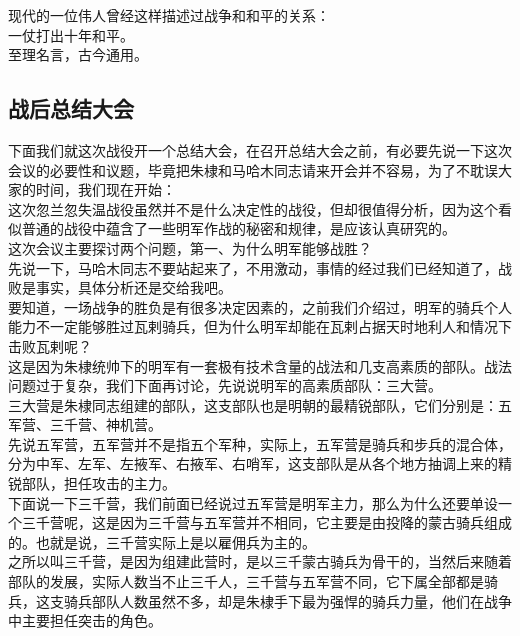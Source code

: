 \begin{multicols}{\theparacolNo}
现代的一位伟人曾经这样描述过战争和和平的关系：\\

一仗打出十年和平。\\

至理名言，古今通用。\\

\subsection{战后总结大会}
下面我们就这次战役开一个总结大会，在召开总结大会之前，有必要先说一下这次会议的必要性和议题，毕竟把朱棣和马哈木同志请来开会并不容易，为了不耽误大家的时间，我们现在开始：\\

这次忽兰忽失温战役虽然并不是什么决定性的战役，但却很值得分析，因为这个看似普通的战役中蕴含了一些明军作战的秘密和规律，是应该认真研究的。\\

这次会议主要探讨两个问题，第一、为什么明军能够战胜？\\

先说一下，马哈木同志不要站起来了，不用激动，事情的经过我们已经知道了，战败是事实，具体分析还是交给我吧。\\

要知道，一场战争的胜负是有很多决定因素的，之前我们介绍过，明军的骑兵个人能力不一定能够胜过瓦剌骑兵，但为什么明军却能在瓦剌占据天时地利人和情况下击败瓦剌呢？\\

这是因为朱棣统帅下的明军有一套极有技术含量的战法和几支高素质的部队。战法问题过于复杂，我们下面再讨论，先说说明军的高素质部队：三大营。\\

三大营是朱棣同志组建的部队，这支部队也是明朝的最精锐部队，它们分别是：五军营、三千营、神机营。\\

先说五军营，五军营并不是指五个军种，实际上，五军营是骑兵和步兵的混合体，分为中军、左军、左掖军、右掖军、右哨军，这支部队是从各个地方抽调上来的精锐部队，担任攻击的主力。\\

下面说一下三千营，我们前面已经说过五军营是明军主力，那么为什么还要单设一个三千营呢，这是因为三千营与五军营并不相同，它主要是由投降的蒙古骑兵组成的。也就是说，三千营实际上是以雇佣兵为主的。\\

之所以叫三千营，是因为组建此营时，是以三千蒙古骑兵为骨干的，当然后来随着部队的发展，实际人数当不止三千人，三千营与五军营不同，它下属全部都是骑兵，这支骑兵部队人数虽然不多，却是朱棣手下最为强悍的骑兵力量，他们在战争中主要担任突击的角色。\\


\end{multicols}
